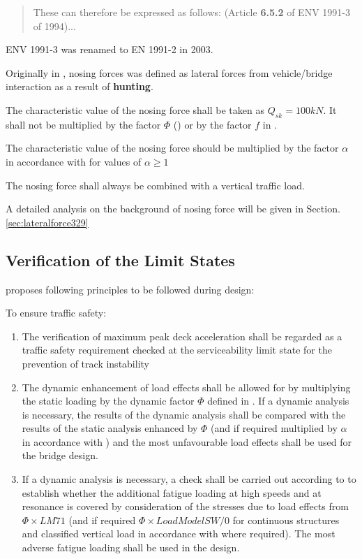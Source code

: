 \begin{appendices}
\begin{quote}
	These can therefore be expressed as follows: (Article \textbf{6.5.2} of ENV 1991-3 of 1994)...
\end{quote}

ENV 1991-3 was renamed to EN 1991-2 in 2003.

Originally in \citet[4:Draft Recommendations]{d181}, nosing forces was defined as lateral forces from vehicle/bridge interaction as a result of \textbf{hunting}.

The characteristic value of the nosing force shall be taken as $Q_{sk} = 100kN$. It shall not be multiplied by the factor $\Phi$ (\citet[6.45]{EC12}) or by the factor $f$ in \citet[6.51]{EC12}. 

The characteristic value of the nosing force should be multiplied by the factor $\alpha$ in accordance with \citet[6.3.2]{EC12} for values of $\alpha \geq 1$

The nosing force shall always be combined with a vertical traffic load.

A detailed analysis on the background of nosing force will be given in Section.\ref{sec:lateralforce329}


\subsection{Verification of the Limit States}
\citet[6.4.6.5]{EC12} proposes following principles to be followed during design:

To ensure traffic safety:
\begin{enumerate}
	\item The verification of maximum peak deck acceleration shall be regarded as a traffic safety requirement checked at the serviceability limit state for the prevention of track instability
	\item The dynamic enhancement of load effects shall be allowed for by multiplying the static loading by the dynamic factor $\varPhi$ defined in \citet[6.4.5]{EC12}. If a dynamic analysis is necessary, the results of the dynamic analysis shall be compared with the results of the static analysis enhanced by $\varPhi$ (and if required multiplied by $\alpha$ in accordance with \citet[6.3.2]{EC12}) and the most unfavourable load effects shall be used for the bridge design.
	\item If a dynamic analysis is necessary, a check shall be carried out according to \citet[6.4.6.6]{EC12} to establish whether the additional fatigue loading at high speeds and at resonance is covered by consideration of the stresses due to load effects from $\varPhi \times LM71$ (and if required $\varPhi \times Load Model SW/0$ for continuous structures and classified vertical load in accordance with \citet[6.3.2(3)]{EC12} where required). The most adverse fatigue loading shall be used in the design.  
\end{enumerate}


\end{appendices}
